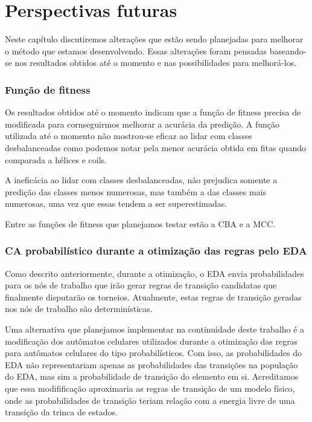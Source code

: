 \chapter{Perspectivas futuras}

Neste capítulo discutiremos alterações que estão sendo planejadas para melhorar o método que estamos desenvolvendo. Essas alterações foram pensadas baseando-se nos resultados obtidos até o momento e nas possibilidades para melhorá-los.

\subsection{Função de fitness}

Os resultados obtidos até o momento indicam que a função de fitness precisa de modificada para cornseguirmos melhorar a acurácia da predição. A função utilizada até o momento não mostrou-se eficaz ao lidar com classes desbalanceadas como podemos notar pela menor acurácia obtida em fitas quando comparada a hélices e coils.

A ineficácia ao lidar com classes desbalanceadas, não prejudica somente a predição das classes menos numerosas, mas também a das classes mais numerosas, uma vez que essas tendem a ser superestimadas.

Entre as funções de fitness que planejamos testar estão a CBA e a MCC.  




\subsection{CA probabilístico durante a otimização das regras pelo EDA}

Como descrito anteriormente, durante a otimização, o EDA envia probabilidades para os nós de trabalho que irão gerar regras de transição candidatas que finalmente disputarão os torneios. Atualmente, estas regras de transição geradas nos nós de trabalho são determinísticas. 
 
Uma alternativa que planejamos implementar na continuidade deste trabalho é a modificação dos autômatos celulares utilizados durante a otimização das regras para autômatos celulares do tipo probabilísticos. Com isso, as probabilidades do EDA não representariam apenas as probabilidades das transições na população do EDA, mas sim a probabilidade de transição do elemento em si. Acreditamos que essa modifificação aproximaria as regras de transição de um modelo físico, onde as probabilidades de transição teriam relação com a energia livre de uma transição da trinca de estados. 



